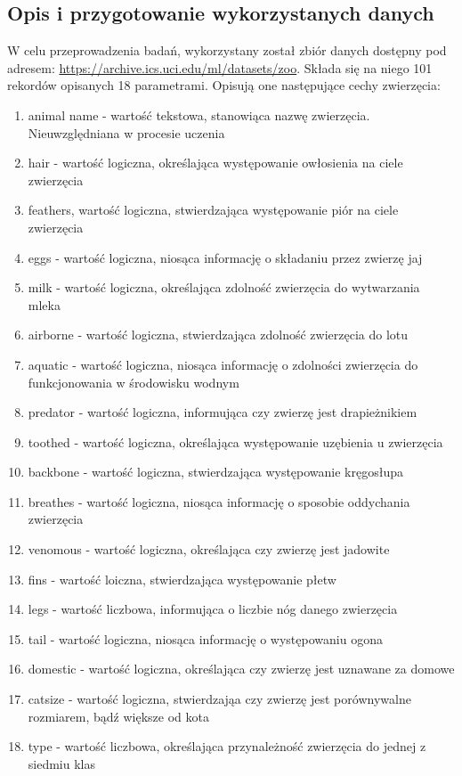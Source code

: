 \documentclass[12pt,twoside]{article}
\begin{document}
\subsection{Opis i przygotowanie wykorzystanych danych}
W celu przeprowadzenia badań, wykorzystany został zbiór danych dostępny pod adresem: \url{https://archive.ics.uci.edu/ml/datasets/zoo}.
Składa się na niego 101 rekordów opisanych 18 parametrami. Opisują one następujące cechy zwierzęcia:
\begin{enumerate}
	\item animal name - wartość tekstowa, stanowiąca nazwę zwierzęcia. Nieuwzględniana w procesie uczenia
	\item hair - wartość logiczna, określająca występowanie owłosienia na ciele zwierzęcia
	\item feathers, wartość logiczna, stwierdzająca występowanie piór na ciele zwierzęcia
	\item eggs - wartość logiczna, niosąca informację o składaniu przez zwierzę jaj
	\item milk - wartość logiczna, określająca zdolność zwierzęcia do wytwarzania mleka
	\item airborne - wartość logiczna, stwierdzająca zdolność zwierzęcia do lotu
	\item aquatic - wartość logiczna, niosąca informację o zdolności zwierzęcia do funkcjonowania w środowisku wodnym
	\item predator - wartość logiczna, informująca czy zwierzę jest drapieżnikiem
	\item toothed - wartość logiczna, określająca występowanie uzębienia u zwierzęcia
	\item backbone - wartość logiczna, stwierdzająca występowanie kręgosłupa
	\item breathes - wartość logiczna, niosąca informację o sposobie oddychania zwierzęcia
	\item venomous - wartość logiczna, określająca czy zwierzę jest jadowite
	\item fins - wartość loiczna, stwierdzająca występowanie płetw
	\item legs - wartość liczbowa, informująca o liczbie nóg danego zwierzęcia
	\item tail - wartość logiczna, niosąca informację o występowaniu ogona
	\item domestic - wartość logiczna, określająca czy zwierzę jest uznawane za domowe
	\item catsize - wartość logiczna, stwierdzająa czy zwierzę jest porównywalne rozmiarem, bądź większe od kota
	\item type - wartość liczbowa, określająca przynależność zwierzęcia do jednej z siedmiu klas
\end{enumerate}
\end{document}
